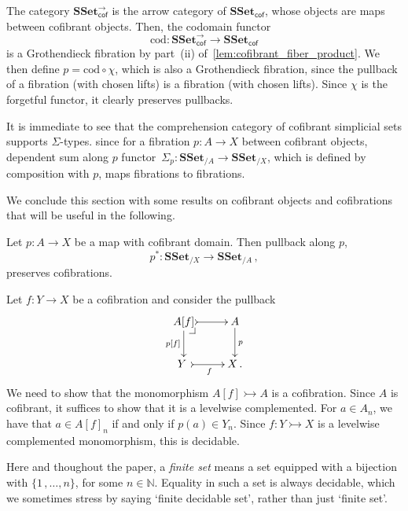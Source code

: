 \documentclass[reqno,10pt,a4paper,oneside,draft]{amsart}
\makeatletter
\renewenvironment{proof}[1][\proofname] {\par\pushQED{\qed}\normalfont\topsep6\p@\@plus6\p@\relax\trivlist\item[\hskip\labelsep\bf#1\@addpunct{.}]\ignorespaces}{\popQED\endtrivlist\@endpefalse}
\numberwithin{equation}{section}
\theoremstyle{mythm}
\theoremstyle{mydef}
\theoremstyle{myrmk}
\newcommand{\pullback}[1]{\save*!/#1-1.2pc/#1:(-1,1)@^{|-}\restore}
\newcommand{\drpullback}{\pullback{dr}}
\newcommand{\co}{\colon}
\newcommand{\SSet}{\mathbf{SSet}}
\makeatother
\begin{document}
\begin{proof} The category $\SSet^\to_{\mathsf{cof}}$ is the arrow category of $\SSet_{\mathsf{cof}}$, whose objects are
maps  between cofibrant objects. Then, the codomain
functor 
\[
\mathrm{cod} \co \SSet^{\to}_{\mathsf{cof}} \to \SSet_{\mathsf{cof}}
\] 
is a Grothendieck fibration by part~(ii) of~\cref{lem:cofibrant_fiber_product}. We then define $p = \mathrm{cod} \circ \chi$, which
 is also a Grothendieck fibration, since the pullback of a fibration (with chosen lifts) is a fibration (with chosen lifts).
  Since $\chi$ is the forgetful functor, it clearly preserves pullbacks.
\end{proof}



\begin{remark} \label{thm:sigma-types} It is immediate to see that the comprehension category of cofibrant simplicial sets supports $\Sigma$-types. since for a fibration $p \co A \to X$ between cofibrant objects, dependent sum along $p$  functor~$\Sigma_p \co \SSet_{/A} \to \SSet_{/X}$, which is defined by
composition with $p$, maps fibrations to fibrations.
\end{remark}

\medskip


We conclude this section with some  results on cofibrant objects and cofibrations
that will be useful in the following. 


\begin{proposition} \label{thm:cof-pbk}  Let $p \co A \to X$  be a map with cofibrant domain.
Then pullback along $p$, \[
p^* \co \SSet_{/X} \to \SSet_{/A} \, , 
\]
preserves cofibrations. 
\end{proposition}

\begin{proof} Let $f \co Y \to X$ be a cofibration and consider the pullback
\[
\xymatrix{
A[f]  \ar@{>->}[r] \drpullback \ar[d]_-{p[f]} &  A \ar[d]^{p} \\
Y \ar@{>->}[r]_{f} \ & X \, .}
\]
We need to show that the monomorphism $A[f] \rightarrowtail A$ is a cofibration. 
Since $A$ is cofibrant, it suffices to show that it is a levelwise complemented. For $a \in A_n$, we have that $a \in A[f]_n$ if and only if $p(a) \in Y_n$. Since $f \co Y \rightarrowtail X$ is a levelwise complemented monomorphism, this is decidable.
\end{proof} 

Here and thoughout the paper, a {\em finite set} means a set equipped with a bijection with $\{1 \, , \ldots,  n \}$, for some $n \in \mathbb{N}$. Equality in such a set
is always decidable, which we sometimes stress by saying `finite decidable set', rather than just `finite set'. 
\end{document}

